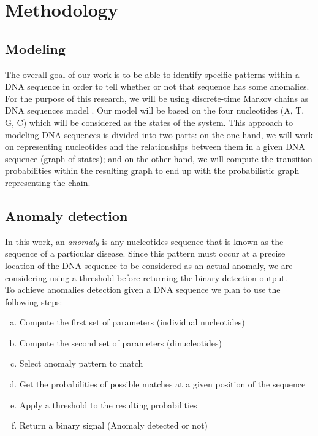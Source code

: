 \documentclass[10pt,twocolumn,letterpaper]{article}
\begin{document}
\section{Methodology}
 {  
    \subsection{Modeling}  
    {
        The overall goal of our work is to be able to identify specific patterns within a DNA sequence in order to tell whether or not that sequence has some anomalies.\\
        For the purpose of this research, we will be using discrete-time Markov chains as DNA sequences model \cite{singh}. 
       Our model will be based on the four nucleotides (A, T, G, C) which will be considered as the states of the system.
       This approach to modeling DNA sequences is divided into two parts: on the one hand, we will work on representing nucleotides and the relationships between them in a given DNA sequence (graph of states); 
           and on the other hand, we will compute the transition probabilities within the resulting graph to end up with the probabilistic graph representing the chain.
    }  

    \subsection{Anomaly detection}
    {In this work, an \textit{anomaly} is any nucleotides sequence that is known as the sequence of a particular disease. Since this pattern must occur at a precise location of the DNA sequence to be considered as an actual 
    anomaly, we are considering using a threshold before returning the binary detection output.\\ 
    To achieve anomalies detection given a DNA sequence we plan to use the following steps:
    \begin{enumerate}[a.]
        \item Compute the first set of parameters (individual nucleotides)
        \item Compute the second set of parameters (dinucleotides)
        \item Select anomaly pattern to match
        \item Get the probabilities of possible matches at a given position of the sequence
        \item Apply a threshold to the resulting probabilities
        \item Return a binary signal (Anomaly detected or not)
    \end{enumerate}
    }
 }



 {\small
  
  
 }
\end{document}
